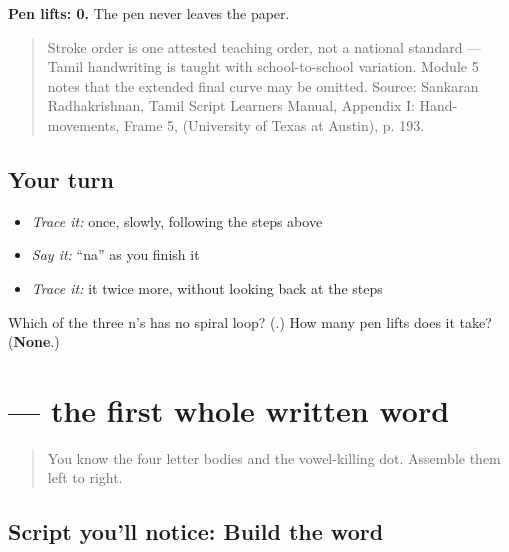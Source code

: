 \textbf{Pen lifts: 0.} The pen never leaves the paper.

\begin{quote}
Stroke order is one attested teaching order, not a national standard — Tamil handwriting is taught with school-to-school variation. Module 5 notes that the extended final curve may be omitted. Source: Sankaran Radhakrishnan, Tamil Script Learners Manual, Appendix I: Hand-movements, Frame 5,  (University of Texas at Austin), p. 193.
\end{quote}

\subsection*{Your turn}
\begin{itemize}
\raggedright
  \item \emph{Trace it:}  once, slowly, following the steps above
  \item \emph{Say it:} \textquotedblleft{}na\textquotedblright{} as you finish it
  \item \emph{Trace it:} it twice more, without looking back at the steps
\end{itemize}

\begin{tcolorbox}[breakable,colback=teal!4,colframe=teal!35!black,title={Before you move on}]
Which of the three n's has no spiral loop? (\textbf{}.) How many pen lifts does it take? (\textbf{None}.)
\end{tcolorbox}
\section[\texorpdfstring{\ta{வணக்கம்} (vaṇakkam)}{வணக்கம் (vaṇakkam)}]{ — the first whole written word}

\label{lesson:TA-W03-write-vanakkam}



\begin{quote}
You know the four letter bodies and the vowel-killing dot. Assemble them left to right.
\end{quote}

\subsection*{Script you'll notice: Build the word}

